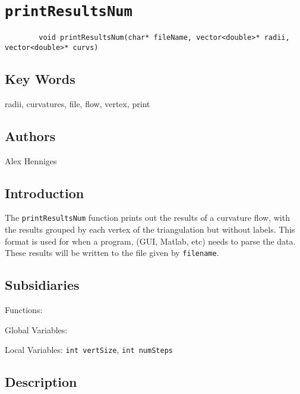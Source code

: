 \documentclass[10pt]{article}%
\begin{document}

\section*{\texttt{printResultsNum}}

\label{f0}{\small{\begin{verbatim} 
        void printResultsNum(char* fileName, vector<double>* radii, vector<double>* curvs)
\end{verbatim}
}}

\subsection*{Key Words}

radii, curvatures, file, flow, vertex, print

\subsection*{Authors}

Alex Henniges

\subsection*{Introduction}

 The \texttt{printResultsNum} function prints out the results of a curvature
flow, with the results grouped by each vertex of the triangulation but
without labels. This format is used for when a program, (GUI, Matlab,
etc) needs to parse the data. These results will be written to the
file given by \texttt{filename}.

\subsection*{Subsidiaries}

Functions:

Global Variables:

Local Variables: \texttt{int vertSize}, \texttt{int numSteps}

\subsection*{Description}
\end{document}
